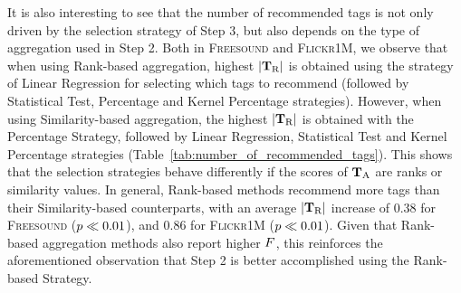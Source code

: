 It is also interesting to see that the number of recommended tags is not only driven by the selection strategy of Step 3, but also depends on the type of aggregation used in Step 2. Both in \textsc{Freesound} and \textsc{Flickr1M}, we observe that when using Rank-based aggregation, highest $|\mathbf{T}_{\text{R}}|$ is obtained using the strategy of Linear Regression for selecting which tags to recommend (followed by Statistical Test, Percentage and Kernel Percentage strategies). 
However, when using Similarity-based aggregation, the highest $|\mathbf{T}_{\text{R}}|$ is obtained with the Percentage Strategy, followed by Linear Regression, Statistical Test and Kernel Percentage strategies  (Table~\ref{tab:number_of_recommended_tags}). This shows that the selection strategies behave differently if the scores of $\mathbf{T}_{\text{A}}$ are ranks or similarity values. In general, Rank-based methods recommend more tags than their Similarity-based counterparts, with an average $|\mathbf{T}_{\text{R}}|$ increase of 0.38 for \textsc{Freesound} ($p\ll0.01$), and 0.86 for \textsc{Flickr1M} ($p\ll0.01$).
Given that Rank-based aggregation methods also report higher $F$, this reinforces the aforementioned observation that Step 2 is better accomplished using the Rank-based Strategy.

